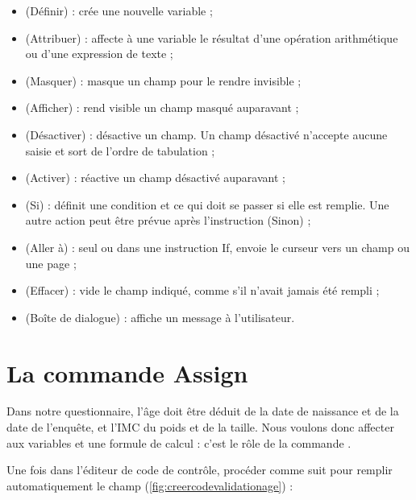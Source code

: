 \begin{itemize}[label=]
	\item {} (Définir) : crée une nouvelle variable ;
	\item {} (Attribuer) : affecte à une variable le résultat d'une opération arithmétique ou d'une expression de texte ;
	\item {} (Masquer) : masque un champ pour le rendre invisible ;
	\item {} (Afficher) : rend visible un champ masqué auparavant ;
	\item {} (Désactiver) : désactive un champ. Un champ désactivé n'accepte aucune saisie et sort de l'ordre de tabulation ;
	\item {} (Activer) : réactive un champ désactivé auparavant ;
	\item {} (Si) : définit une condition et ce qui doit se passer si elle est remplie. Une autre action peut être prévue après l'instruction  (Sinon) ;
	\item {} (Aller à) : seul ou dans une instruction If, envoie le curseur vers un champ ou une page ;
	\item {} (Effacer) : vide le champ indiqué, comme s'il n'avait jamais été rempli ;
	\item {} (Boîte de dialogue) : affiche un message à l'utilisateur.
\end{itemize}

\section{La commande Assign}

Dans notre questionnaire, l'âge doit être déduit de la date de naissance et de la date de l'enquête, et l'IMC du poids et de la taille. Nous voulons donc affecter aux variables  et  une formule de calcul : c'est le rôle de la commande .

Une fois dans l'éditeur de code de contrôle, procéder comme suit pour remplir automatiquement le champ  (\autoref{fig:creercodevalidationage}) :

